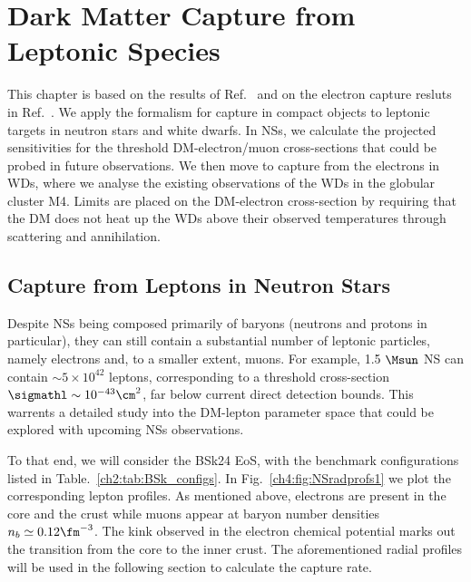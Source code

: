 \graphicspath{{img/capture_leptons/}}

\chapter{Dark Matter Capture from Leptonic Species}
\label{chapter:capture_leptons}

\begin{synopsis}
This chapter is based on the results of Ref.~\cite{Bell:2020lmm_mar_ImprovedTreatmentDark} and on the electron capture resluts in Ref.~\cite{Bell:2021fye_oct_Improvedtreatmentdark}. We apply the formalism for capture in compact objects to leptonic targets in neutron stars and white dwarfs. In NSs, we calculate the projected sensitivities for the threshold DM-electron/muon cross-sections that could be probed in future observations. We then move to capture from the electrons in WDs, where we analyse the existing observations of the WDs in the globular cluster M4. Limits are placed on the DM-electron cross-section by requiring that the DM does not heat up the WDs above their observed temperatures through scattering and annihilation.
\end{synopsis}



\section{Capture from Leptons in Neutron Stars}
\label{ch4:sec:lep_NS}
Despite NSs being composed primarily of baryons (neutrons and protons in particular), they can still contain a substantial number of leptonic particles, namely electrons and, to a smaller extent, muons. For example, 1.5 $\Msun$ NS can contain $\sim 5\times 10^42$ leptons, corresponding to a threshold cross-section $\sigmathl\sim 10^{-43}\cm^2$, far below current direct detection bounds. This warrents a detailed study into the DM-lepton parameter space that could be explored with upcoming NSs observations. 

To that end, we will consider the BSk24 EoS, with the benchmark configurations listed in Table.~\ref{ch2:tab:BSk_configs}.
In Fig.~\ref{ch4:fig:NSradprofs1} we plot the corresponding lepton profiles.
As mentioned above, electrons are present in the core and the crust while muons appear at baryon number densities $n_b\simeq 0.12\fm^{-3}$. The kink observed in the electron chemical potential marks out the transition from the core to the inner crust. 
The aforementioned radial profiles will be used in the following section to calculate the capture rate. 

